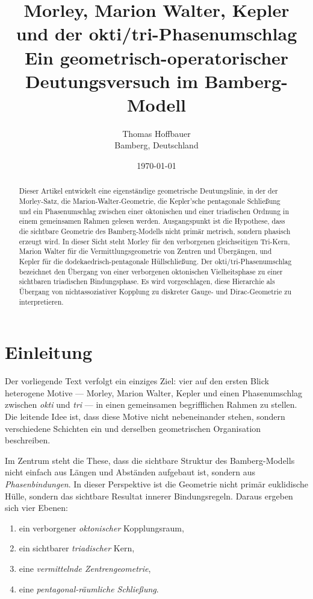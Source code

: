 \documentclass[11pt,a4paper]{article}
\title{Morley, Marion Walter, Kepler und der okti/tri-Phasenumschlag\\
	\large Ein geometrisch-operatorischer Deutungsversuch im Bamberg-Modell}
\author{Thomas Hoffbauer\\Bamberg, Deutschland}
\date{\today}
\theoremstyle{remark}
\begin{document}
	\maketitle
	
	\begin{abstract}
		Dieser Artikel entwickelt eine eigenständige geometrische Deutungslinie, in der der Morley-Satz, die Marion-Walter-Geometrie, die Kepler'sche pentagonale Schließung und ein Phasenumschlag zwischen einer oktonischen und einer triadischen Ordnung in einem gemeinsamen Rahmen gelesen werden. Ausgangspunkt ist die Hypothese, dass die sichtbare Geometrie des Bamberg-Modells nicht primär metrisch, sondern phasisch erzeugt wird. In dieser Sicht steht Morley für den verborgenen gleichseitigen Tri-Kern, Marion Walter für die Vermittlungsgeometrie von Zentren und Übergängen, und Kepler für die dodekaedrisch-pentagonale Hüllschließung. Der okti/tri-Phasenumschlag bezeichnet den Übergang von einer verborgenen oktonischen Vielheitsphase zu einer sichtbaren triadischen Bindungsphase. Es wird vorgeschlagen, diese Hierarchie als Übergang von nichtassoziativer Kopplung zu diskreter Gauge- und Dirac-Geometrie zu interpretieren.
	\end{abstract}
	
	\section{Einleitung}
	
	Der vorliegende Text verfolgt ein einziges Ziel: vier auf den ersten Blick heterogene Motive --- Morley, Marion Walter, Kepler und einen Phasenumschlag zwischen \emph{okti} und \emph{tri} --- in einen gemeinsamen begrifflichen Rahmen zu stellen. Die leitende Idee ist, dass diese Motive nicht nebeneinander stehen, sondern verschiedene Schichten ein und derselben geometrischen Organisation beschreiben.
	
	Im Zentrum steht die These, dass die sichtbare Struktur des Bamberg-Modells nicht einfach aus Längen und Abständen aufgebaut ist, sondern aus \emph{Phasenbindungen}. In dieser Perspektive ist die Geometrie nicht primär euklidische Hülle, sondern das sichtbare Resultat innerer Bindungsregeln. Daraus ergeben sich vier Ebenen:
	\begin{enumerate}[label=(\arabic*)]
		\item ein verborgener \emph{oktonischer} Kopplungsraum,
		\item ein sichtbarer \emph{triadischer} Kern,
		\item eine \emph{vermittelnde Zentrengeometrie},
		\item eine \emph{pentagonal-räumliche Schließung}.
	\end{enumerate}
	
\end{document}
